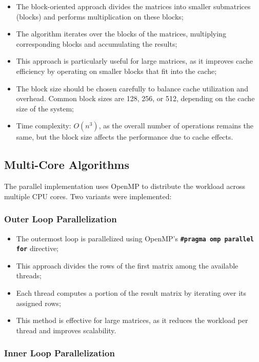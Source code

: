 \documentclass{article}
\begin{document}
\begin{itemize}
\item The block-oriented approach divides the matrices into smaller submatrices (blocks) and performs multiplication on these blocks;
\item The algorithm iterates over the blocks of the matrices, multiplying corresponding blocks and accumulating the results;
\item This approach is particularly useful for large matrices, as it improves cache efficiency by operating on smaller blocks that fit into the cache;
\item The block size should be chosen carefully to balance cache utilization and overhead. Common block sizes are 128, 256, or 512, depending on the cache size of the system;
\item Time complexity: $O(n^3)$, as the overall number of operations remains the same, but the block size affects the performance due to cache effects.
\end{itemize}

\subsection{Multi-Core Algorithms}

The parallel implementation uses OpenMP to distribute the workload across multiple CPU cores. Two variants were implemented:


\subsubsection{Outer Loop Parallelization}


\begin{itemize}
\item The outermost loop is parallelized using OpenMP's \textbf{\lstinline{#pragma omp parallel for}} directive;
\item This approach divides the rows of the first matrix among the available threads;
\item Each thread computes a portion of the result matrix by iterating over its assigned rows;
\item This method is effective for large matrices, as it reduces the workload per thread and improves scalability.
\end{itemize}

\subsubsection{Inner Loop Parallelization}
        
\end{document}
